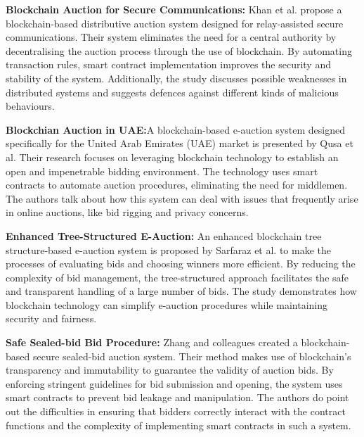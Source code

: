 \documentclass[conference]{IEEEtran}
\begin{document}
\textbf{Blockchain Auction for Secure Communications:}
Khan et al. \cite{khanBlockchainBasedDistributiveAuction2019} propose a blockchain-based distributive auction system designed for relay-assisted secure communications. Their system eliminates the need for a central authority by decentralising the auction process through the use of blockchain. By automating transaction rules, smart contract implementation improves the security and stability of the system. Additionally, the study discusses possible weaknesses in distributed systems and suggests defences against different kinds of malicious behaviours.

\textbf{Blockchian Auction in UAE:}A blockchain-based e-auction system designed specifically for the United Arab Emirates (UAE) market is presented by Qusa et al\cite{qusaSecureEAuctionSystem2020}. Their research focuses on leveraging blockchain technology to establish an open and impenetrable bidding environment. The technology uses smart contracts to automate auction procedures, eliminating the need for middlemen. The authors talk about how this system can deal with issues that frequently arise in online auctions, like bid rigging and privacy concerns.

\textbf{Enhanced Tree-Structured E-Auction:}
An enhanced blockchain tree structure-based e-auction system is proposed by Sarfaraz et al. \cite{sarfarazTreeStructurebasedImproved2021} to make the processes of evaluating bids and choosing winners more efficient. By reducing the complexity of bid management, the tree-structured approach facilitates the safe and transparent handling of a large number of bids. The study demonstrates how blockchain technology can simplify e-auction procedures while maintaining security and fairness.

\textbf{Safe Sealed-bid Bid Procedure:}
Zhang and colleagues \cite{zhangSSBASFASecureSealedbid2022} created a blockchain-based secure sealed-bid auction system. Their method makes use of blockchain's transparency and immutability to guarantee the validity of auction bids. By enforcing stringent guidelines for bid submission and opening, the system uses smart contracts to prevent bid leakage and manipulation. The authors do point out the difficulties in ensuring that bidders correctly interact with the contract functions and the complexity of implementing smart contracts in such a system.

\end{document}
